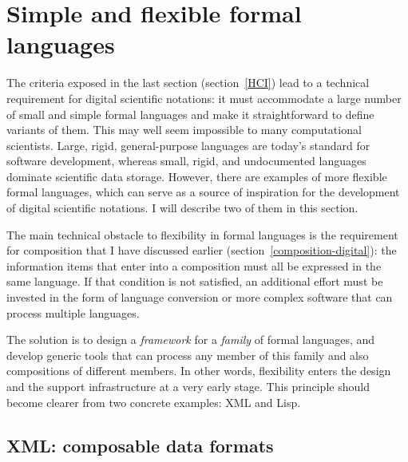 \section{Simple and flexible formal languages}
\label{simple-and-flexible}

The criteria exposed in the last section (section~\ref{HCI}) lead to a technical requirement for digital scientific notations: it must accommodate a large number of small and simple formal languages and make it straightforward to define variants of them. This may well seem impossible to many computational scientists. Large, rigid, general-purpose languages are today's standard for software development, whereas small, rigid, and undocumented languages dominate scientific data storage. However, there are examples of more flexible formal languages, which can serve as a source of inspiration for the development of digital scientific notations. I will describe two of them in this section.

The main technical obstacle to flexibility in formal languages is the requirement for composition that I have discussed earlier (section~\ref{composition-digital}): the information items that enter into a composition must all be expressed in the same language. If that condition is not satisfied, an additional effort must be invested in the form of language conversion or more complex software that can process multiple languages.

The solution is to design a \textit{framework} for a \textit{family} of formal languages, and develop generic tools that can process any member of this family and also compositions of different members. In other words, flexibility enters the design and the support infrastructure at a very early stage. This principle should become clearer from two concrete examples: XML and Lisp.

\subsection{XML: composable data formats}
\label{XML}

